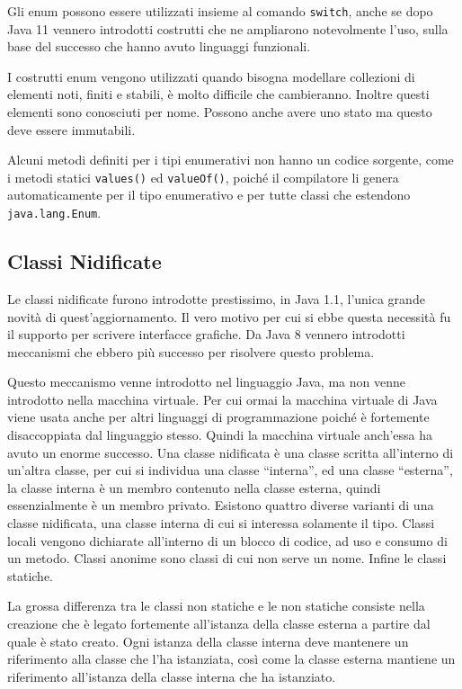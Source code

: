 \documentclass{article}
\numberwithin{equation}{subsection}
\begin{document}
Gli enum possono essere utilizzati insieme al comando \verb|switch|, anche se dopo Java 11 vennero introdotti costrutti che ne ampliarono notevolmente l'uso, sulla base del 
successo che hanno avuto linguaggi funzionali. 

I costrutti enum vengono utilizzati quando bisogna modellare collezioni di elementi noti, finiti e stabili, è molto difficile che cambieranno. Inoltre questi elementi sono conosciuti 
per nome. Possono anche avere uno stato ma questo deve essere immutabili. 

Alcuni metodi definiti per i tipi enumerativi non hanno un codice sorgente, come i metodi statici \verb|values()| ed \verb|valueOf()|, poiché il compilatore li genera automaticamente per il tipo 
enumerativo e per tutte classi che estendono \verb|java.lang.Enum|. 

\subsection{Classi Nidificate}

Le classi nidificate furono introdotte prestissimo, in Java 1.1, l'unica grande novità di quest'aggiornamento. 
Il vero motivo per cui si ebbe questa necessità fu il supporto per scrivere interfacce grafiche. 
Da Java 8 vennero introdotti meccanismi che ebbero più successo per risolvere questo problema. 

Questo meccanismo venne introdotto nel linguaggio Java, ma non venne introdotto nella macchina virtuale. Per cui ormai la macchina virtuale di Java viene usata anche per 
altri linguaggi di programmazione poiché è fortemente disaccoppiata dal linguaggio stesso. Quindi la macchina virtuale anch'essa ha avuto un enorme successo. 
Una classe nidificata è una classe scritta all'interno di un'altra classe, per cui si individua una classe ``interna'', ed una classe ``esterna'', la classe interna è un 
membro contenuto nella classe esterna, quindi essenzialmente è un membro privato. 
Esistono quattro diverse varianti di una classe nidificata, una classe interna di cui si interessa solamente il tipo. 
Classi locali vengono dichiarate all'interno di un blocco di codice, ad uso e consumo di un metodo. 
Classi anonime sono classi di cui non serve un nome. 
Infine le classi statiche. 

La grossa differenza tra le classi non statiche e le non statiche consiste nella creazione che è legato fortemente all'istanza della classe esterna a partire dal quale è stato 
creato. Ogni istanza della classe interna deve mantenere un riferimento alla classe che l'ha istanziata, così come la classe esterna mantiene un riferimento all'istanza 
della classe interna che ha istanziato.  
\end{document}
